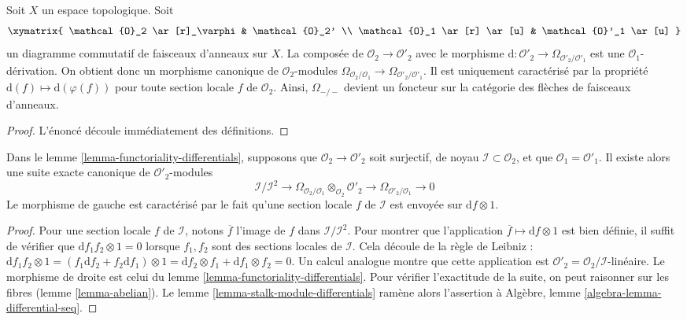 \begin{lemma}
\label{lemma-functoriality-differentials}
Soit $X$ un espace topologique. Soit
$$
\xymatrix{
\mathcal{O}_2 \ar[r]_\varphi & \mathcal{O}_2' \\
\mathcal{O}_1 \ar[r] \ar[u] & \mathcal{O}'_1 \ar[u]
}
$$
un diagramme commutatif de faisceaux d'anneaux sur $X$. La composée de
$\mathcal{O}_2 \to \mathcal{O}'_2$ avec le morphisme
$\text{d} : \mathcal{O}'_2 \to \Omega_{\mathcal{O}'_2/\mathcal{O}'_1}$
est une $\mathcal{O}_1$-dérivation. On obtient donc un morphisme canonique
de $\mathcal{O}_2$-modules
$\Omega_{\mathcal{O}_2/\mathcal{O}_1} \to
\Omega_{\mathcal{O}'_2/\mathcal{O}'_1}$.
Il est uniquement caractérisé par la propriété
$\text{d}(f) \mapsto \text{d}(\varphi(f))$
pour toute section locale $f$ de $\mathcal{O}_2$. Ainsi,
$\Omega_{-/-}$ devient un foncteur sur la catégorie des flèches de faisceaux
d'anneaux.
\end{lemma}

\begin{proof}
L'énoncé découle immédiatement des définitions.
\end{proof}

\begin{lemma}
\label{lemma-differential-seq}
Dans le lemme \ref{lemma-functoriality-differentials}, supposons que
$\mathcal{O}_2 \to \mathcal{O}'_2$ soit surjectif, de noyau
$\mathcal{I} \subset \mathcal{O}_2$, et que
$\mathcal{O}_1 = \mathcal{O}'_1$. Il existe alors une suite exacte canonique
de $\mathcal{O}'_2$-modules
$$
\mathcal{I}/\mathcal{I}^2
\longrightarrow
\Omega_{\mathcal{O}_2/\mathcal{O}_1} \otimes_{\mathcal{O}_2} \mathcal{O}'_2
\longrightarrow
\Omega_{\mathcal{O}'_2/\mathcal{O}_1}
\longrightarrow
0
$$
Le morphisme de gauche est caractérisé par le fait qu'une section locale
$f$ de $\mathcal{I}$ est envoyée sur $\text{d}f \otimes 1$.
\end{lemma}

\begin{proof}
Pour une section locale $f$ de $\mathcal{I}$, notons $\overline{f}$ l'image
de $f$ dans $\mathcal{I}/\mathcal{I}^2$. Pour montrer que l'application
$\overline{f} \mapsto \text{d}f \otimes 1$ est bien définie, il suffit de
vérifier que $\text{d} f_1f_2 \otimes 1 = 0$ lorsque $f_1, f_2$ sont des
sections locales de $\mathcal{I}$. Cela découle de la règle de Leibniz :
$\text{d} f_1f_2 \otimes 1 =
(f_1 \text{d}f_2 + f_2 \text{d} f_1 )\otimes 1 =
\text{d}f_2 \otimes f_1 + \text{d}f_1 \otimes f_2 = 0$.
Un calcul analogue montre que cette application est
$\mathcal{O}'_2 = \mathcal{O}_2/\mathcal{I}$-linéaire. Le morphisme de droite
est celui du lemme \ref{lemma-functoriality-differentials}. Pour vérifier
l'exactitude de la suite, on peut raisonner sur les fibres (lemme
\ref{lemma-abelian}). Le lemme \ref{lemma-stalk-module-differentials} ramène
alors l'assertion à Algèbre, lemme \ref{algebra-lemma-differential-seq}.
\end{proof}

